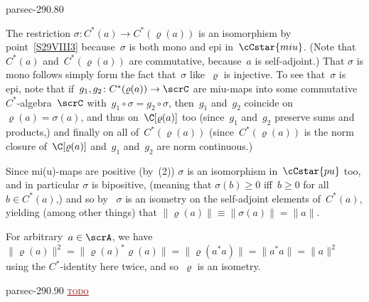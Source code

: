 \documentclass[b5page]{book}
\newcommand{\TODO}[1]{\textcolor{darkred}{\textsc{\underline{todo}}}}
\begin{document}
\begin{solution}{parsec-290.80}
\begin{enumerate}
The restriction $\sigma\colon C^*(a)\to C^*(\varrho(a))$
is an isomorphism by point~\ref{S29VIII3} because~$\sigma$
is both mono and epi in~$\cCstar{miu}$.
(Note that $C^*(a)$ and~$C^*(\varrho(a))$ are commutative,
because~$a$ is self-adjoint.)
That $\sigma$ is mono follows simply form the fact
that~$\sigma$ like~$\varrho$ is injective.
To see that~$\sigma$ is epi,
note that if~$g_1,g_2\colon C^*(\varrho(a))\to\scrC$
are miu-maps into some commutative $C^*$-algebra~$\scrC$
with~$g_1\circ \sigma = g_2\circ \sigma$,
then~$g_1$ and~$g_2$ coincide on~$\varrho(a)=\sigma(a)$,
and thus
on~$\C[\varrho(a)]$ too (since~$g_1$ and~$g_2$ preserve sums and products,)
and finally on all of~$C^*(\varrho(a))$
(since~$C^*(\varrho(a))$ is
the norm closure of~$\C[\varrho(a)]$
and~$g_1$ and~$g_2$ are norm continuous.)

Since mi(u)-maps are positive (by~(2))
$\sigma$ is an isomorphism in~$\cCstar{pu}$ too,
and in particular $\sigma$ is bipositive,
(meaning that $\sigma(b)\geq 0$ iff~$b\geq 0$ for all~$b\in C^*(a)$,)
and so by~
$\sigma$ is an isometry on the self-adjoint elements
of~$C^*(a)$, yielding (among other things) that
$\|\varrho(a)\|\equiv\|\sigma(a)\|= \|a\|$.

For arbitrary~$a\in \scrA$,
we have
$\|\varrho(a)\|^2
= \|\varrho(a)^* \varrho(a)\|
= \|\varrho(a^*a)\|=\|a^*a\|=\|a\|^2$
using the $C^*$-identity here twice,
and so~$\varrho$ is an isometry.
\end{enumerate}
\end{solution}
\begin{solution}{parsec-290.90}
\TODO{}
\end{solution}
\end{document}
